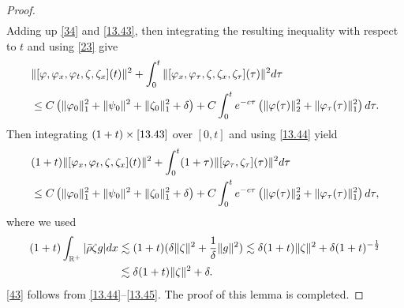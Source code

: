\documentclass[10pt,a4paper]{amsart}
\begin{document}
\begin{proof}
\begin{align}
		\end{align}
Adding up \eqref{34} and \eqref{13.43}, then integrating the resulting inequality with respect to $t$ and using \eqref{23} give
		\begin{align}\label{13.44}
			& \|[\varphi,\varphi_x,\varphi_t,\zeta,\zeta_x](t)\|^2+\int_{0}^{t}\|[\varphi_x,\varphi_\tau,\zeta,\zeta_x,\zeta_{\tau}](\tau)\|^2{\rm d}\tau \notag\\
			&	\leq C\left(\|\varphi_0\|_1^2+\|\psi_0\|^2+\|\zeta_0\|_1^2+\delta\right)+C\int_{0}^{t}{\rm e}^{-c\tau}\left(\|\varphi(\tau)\|_2^2+\|\varphi_{\tau}(\tau)\|_1^2\right){\rm d}\tau.
		\end{align}
Then integrating $(1 + t) \times \eqref{13.43} $ over $[0, t]$ and using \eqref{13.44} yield
		\begin{align}\label{13.45}
			&(1+t)\|[\varphi_x,\varphi_t,\zeta,\zeta_x](t)\|^2+\int_{0}^{t}(1+\tau)\|[\varphi_{\tau},\zeta_{\tau}](\tau)\|^2{\rm d}\tau\notag\\ 
			&\leq C\left(\|\varphi_0\|_1^2+\|\psi_0\|^2+\|\zeta_0\|_1^2+\delta\right)+C\int_{0}^{t}{\rm e}^{-c\tau}\left(\|\varphi(\tau)\|_2^2+\|\varphi_{\tau}(\tau)\|_1^2\right){\rm d}\tau,
		\end{align}
		where we used 
\begin{align}\notag
	(1+t)\int_{\mathbb{R}^+}|\bar\rho\zeta g|{\rm d}x&\lesssim(1+t)(\delta\|\zeta\|^2+\frac{1}{\delta}\|g\|^2)\lesssim\delta(1+t)\|\zeta\|^2+\delta(1+t)^{-\frac{1}{2}}\notag\\ 
	&\lesssim\delta(1+t)\|\zeta\|^2+\delta.\notag
\end{align}
\eqref{43} follows from \eqref{13.44}--\eqref{13.45}. The proof of this lemma is completed.
		\end{proof}
\end{document}
